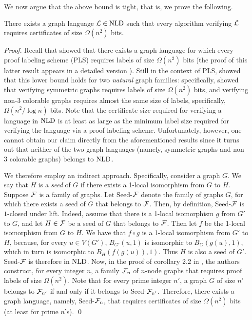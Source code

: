 \documentclass{llncs}
\newcommand{\NLD}{\mbox{\rm NLD}}
\def\cF{{\cal F}}
\def\cL{{\cal L}}
\begin{document}
We now argue that the above bound is tight, that is, we prove the following.

\begin{proposition}
 There exists a graph language $\cL\in\NLD$ such that every algorithm verifying $\cL$ requires certificates of size $\Omega(n^2)$ bits.
\end{proposition}
\begin{proof}

Recall that  \cite{KKP10} showed that there exists a graph language for which every proof labeling scheme (PLS) requires labels of size $\Omega(n^2)$ bits (the proof of this latter result appears in a detailed version \cite{KKP10b}). 
Still in the context of PLS, \cite{GS11} showed that this lower bound holds for  two {\em natural} graph families: specifically, \cite{GS11}  showed that verifying symmetric graphs requires labels of size $\Omega(n^2)$ bits, and verifying   non-3 colorable graphs requires almost the same size of labels, specifically, $\Omega(n^2/\log n)$ bits. Note that  the certificate size required for verifying a language  in $\NLD$ is at least as large as the minimum label size required for verifying the language via a proof labeling scheme. 
Unfortunately, however, one cannot obtain our claim directly from the aforementioned results since it turns out that neither of the two graph languages (namely, symmetric graphs and non-3 colorable graphs) belongs to $\NLD$.

We therefore employ an indirect approach.
Specifically, consider a graph $G$. We say that $H$ is a {\em seed} of $G$ if there exists a 1-local isomorphism from $G$ to $H$.
Suppose $\cF$ is a family of graphs. Let \textsf{Seed-$\cF$} denote the family of graphs $G$, for which there exists a seed of  $G$ that belongs to $\cF$. 
Then, by definition, \textsf{Seed-$\cF$} is  $1$-closed under lift.  Indeed, assume that there is a 1-local isomorphism  $g$ from $G'$ to $G$, and let $H\in \cF$ be a seed of $G$ that belongs to $\cF$. Then let $f$ be the 1-local isomorphism  from $G$ to $H$. We have that $f\circ g$ is a 1-local isomorphism  from $G'$ to $H$, because, for every $u\in V(G')$, $B_{G'}(u,1)$ is isomorphic to $B_G(g(u),1)$, which in turn is isomorphic to $B_H(f(g(u)),1)$. Thus $H$ is also a seed of $G'$.  \textsf{Seed-$\cF$} is therefore in $\NLD$. Now, in the proof of corollary 2.2 in  \cite{KKP10b}, the authors construct, for every integer  $n$, a family $\cF_n$  of $n$-node graphs that requires proof labels of size $\Omega(n^2)$. Note that  for every prime integer $n'$, a graph $G$ of size $n'$ belongs to  $\cF_{n'}$ if and only if it belongs to 
\textsf{Seed-$\cF_{n'}$}.  Therefore, there exists a graph language, namely,   \textsf{Seed-$\cF_{n}$}, that requires  certificates of size $\Omega(n^2)$ bits (at least for prime $n$'s).
\qed
\end{proof}
\end{document}
